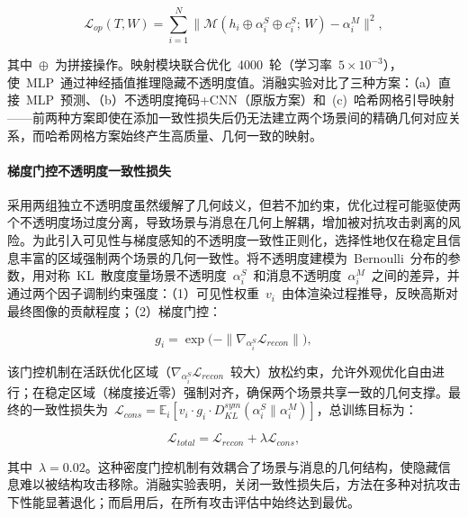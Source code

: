 \begin{equation}
    \mathcal{L}_{op}(T, W) = \sum_{i=1}^{N} \|\mathcal{M}(h_i \oplus \alpha_i^S \oplus c_i^S;\, W) - \alpha_i^M\|^2,
\end{equation}

其中~$\oplus$~为拼接操作。映射模块联合优化~4000~轮（学习率~$5 \times 10^{-3}$），使~MLP~通过神经插值推理隐藏不透明度值。消融实验对比了三种方案：（a）直接~MLP~预测、（b）不透明度掩码+CNN（原版方案）和~(c)~哈希网格引导映射——前两种方案即使在添加一致性损失后仍无法建立两个场景间的精确几何对应关系，而哈希网格方案始终产生高质量、几何一致的映射。

\paragraph{梯度门控不透明度一致性损失}采用两组独立不透明度虽然缓解了几何歧义，但若不加约束，优化过程可能驱使两个不透明度场过度分离，导致场景与消息在几何上解耦，增加被对抗攻击剥离的风险。为此引入可见性与梯度感知的不透明度一致性正则化，选择性地仅在稳定且信息丰富的区域强制两个场景的几何一致性。将不透明度建模为~Bernoulli~分布的参数，用对称~KL~散度度量场景不透明度~$\alpha_i^S$~和消息不透明度~$\alpha_i^M$~之间的差异，并通过两个因子调制约束强度：（1）可见性权重~$v_i$~由体渲染过程推导，反映高斯对最终图像的贡献程度；（2）梯度门控：

\begin{equation}
    g_i = \exp\!\big(-\|\nabla_{\alpha_i^S} \mathcal{L}_{recon}\|\big),
\end{equation}

该门控机制在活跃优化区域（$\nabla_{\alpha_i^S} \mathcal{L}_{recon}$~较大）放松约束，允许外观优化自由进行；在稳定区域（梯度接近零）强制对齐，确保两个场景共享一致的几何支撑。最终的一致性损失为~$\mathcal{L}_{cons} = \mathbb{E}_i[v_i \cdot g_i \cdot D_{KL}^{sym}(\alpha_i^S \| \alpha_i^M)]$，总训练目标为：

\begin{equation}
    \mathcal{L}_{total} = \mathcal{L}_{recon} + \lambda \mathcal{L}_{cons},
\end{equation}

其中~$\lambda = 0.02$。这种密度门控机制有效耦合了场景与消息的几何结构，使隐藏信息难以被结构攻击移除。消融实验表明，关闭一致性损失后，方法在多种对抗攻击下性能显著退化；而启用后，在所有攻击评估中始终达到最优。

